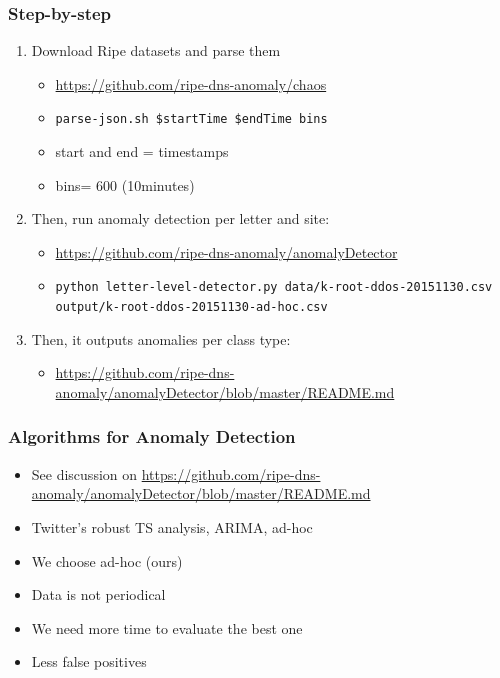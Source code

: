 \documentclass[serif]{beamer}
\begin{document}
\begin{frame}[fragile]
	\frametitle{Step-by-step}
	
\begin{enumerate}
 \item Download Ripe datasets and parse them
 \begin{itemize}
  \item \url{https://github.com/ripe-dns-anomaly/chaos }
  \item \texttt{parse-json.sh \$startTime \$endTime bins}
  \item start and end = timestamps
  \item bins= 600 (10minutes)
 \end{itemize}

 \item Then, run anomaly detection per letter and site:
 \begin{itemize}
  \item \url{https://github.com/ripe-dns-anomaly/anomalyDetector}
  \item \texttt{python letter-level-detector.py data/k-root-ddos-20151130.csv 
output/k-root-ddos-20151130-ad-hoc.csv}
 \end{itemize}

\item Then, it outputs anomalies per class type:
\begin{itemize}
 \item 
\url{https://github.com/ripe-dns-anomaly/anomalyDetector/blob/master/README.md}
\end{itemize}

\end{enumerate}


\end{frame}

\begin{frame}[fragile]
	\frametitle{Algorithms for Anomaly Detection}
	\begin{itemize}
	 \item See discussion on 
\url{https://github.com/ripe-dns-anomaly/anomalyDetector/blob/master/README.md}
	\item Twitter's robust TS analysis, ARIMA, ad-hoc
	\item We choose ad-hoc (ours)
	\item Data is not periodical
	\item We need more time to evaluate the best one
	\item Less false positives
	\end{itemize}


\end{frame}
\end{document}
